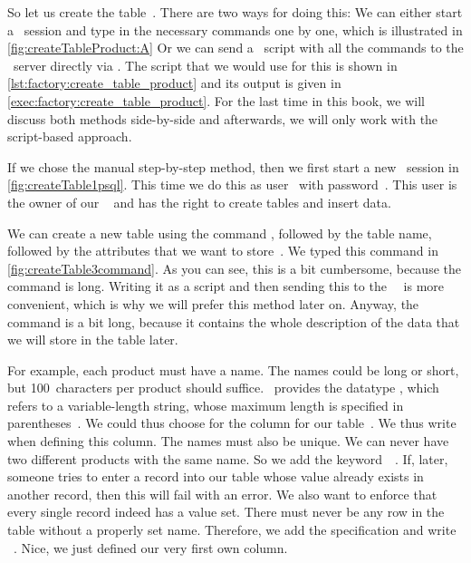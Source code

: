 %
%
%
So let us create the table~.
There are two ways for doing this:
We can either start a \psql\ session and type in the necessary commands one by one, which is illustrated in \cref{fig:createTableProduct:A}%
Or we can send a \sql\ script with all the commands to the \postgresql\ server directly via \psql.
The script that we would use for this is shown in \cref{lst:factory:create_table_product} and its output is given in \cref{exec:factory:create_table_product}.
For the last time in this book, we will discuss both methods side-by-side and afterwards, we will only work with the script-based approach.

If we chose the manual step-by-step method, then we first start a new \psql\ session in \cref{fig:createTable1psql}.
This time we do this as user~ with password~.
This user is the owner of our \db\  and has the right to create tables and insert data.

We can create a new table using the command , followed by the table name, followed by the attributes that we want to store~\cite{PGDG:PD:CT2}.
We typed this command in \cref{fig:createTable3command}.
As you can see, this is a bit cumbersome, because the command is long.
Writing it as a script and then sending this to the \postgresql\ \dbms\ is more convenient, which is why we will prefer this method later on.
Anyway, the command is a bit long, because it contains the whole description of the data that we will store in the table later.

For example, each product must have a name.
The names could be long or short, but 100~characters per product should suffice.
\sql\ provides the datatype , which refers to a variable-length string, whose maximum length is specified in parentheses~\cite{PGDG:PD:CT}.
We could thus choose  for the column  for our table~.
We thus write~ when defining this column.
The names must also be unique.
We can never have two different products with the same name.
So we add the keyword~~\cite{PGDG:PD:C}.
If, later, someone tries to enter a record into our table whose  value already exists in another record, then this will fail with an error.
We also want to enforce that every single record indeed has a  value set.
There must never be any row in the table without a properly set name.
Therefore, we add the  specification and write ~\cite{PGDG:PD:C}.
Nice, we just defined our very first own column.

